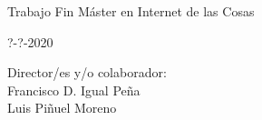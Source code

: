 \begin{center}
   \vspace{0.5cm}
Trabajo Fin Máster en  Internet de las Cosas

   \vspace{0.5cm}






  ?-?-2020\\
   \vspace{1cm}

\end{center}

{\raggedleft
Director/es y/o colaborador:\\
   \vspace{ 1cm}
Francisco D. Igual Peña\\
Luis Piñuel Moreno\\
}



